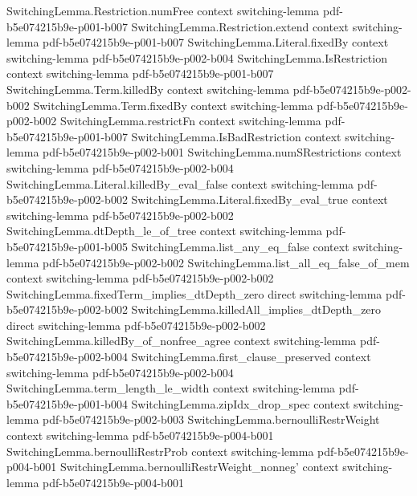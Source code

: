 \begin{theorem}
\proofstep
  {SwitchingLemma.Restriction.numFree}
  {context}
  {switching-lemma}
  {pdf-b5e074215b9e-p001-b007}
\proofstep
  {SwitchingLemma.Restriction.extend}
  {context}
  {switching-lemma}
  {pdf-b5e074215b9e-p001-b007}
\proofstep
  {SwitchingLemma.Literal.fixedBy}
  {context}
  {switching-lemma}
  {pdf-b5e074215b9e-p002-b004}
\proofstep
  {SwitchingLemma.IsRestriction}
  {context}
  {switching-lemma}
  {pdf-b5e074215b9e-p001-b007}
\proofstep
  {SwitchingLemma.Term.killedBy}
  {context}
  {switching-lemma}
  {pdf-b5e074215b9e-p002-b002}
\proofstep
  {SwitchingLemma.Term.fixedBy}
  {context}
  {switching-lemma}
  {pdf-b5e074215b9e-p002-b002}
\proofstep
  {SwitchingLemma.restrictFn}
  {context}
  {switching-lemma}
  {pdf-b5e074215b9e-p001-b007}
\proofstep
  {SwitchingLemma.IsBadRestriction}
  {context}
  {switching-lemma}
  {pdf-b5e074215b9e-p002-b001}
\proofstep
  {SwitchingLemma.numSRestrictions}
  {context}
  {switching-lemma}
  {pdf-b5e074215b9e-p002-b004}
\proofstep
  {SwitchingLemma.Literal.killedBy_eval_false}
  {context}
  {switching-lemma}
  {pdf-b5e074215b9e-p002-b002}
\proofstep
  {SwitchingLemma.Literal.fixedBy_eval_true}
  {context}
  {switching-lemma}
  {pdf-b5e074215b9e-p002-b002}
\proofstep
  {SwitchingLemma.dtDepth_le_of_tree}
  {context}
  {switching-lemma}
  {pdf-b5e074215b9e-p001-b005}
\proofstep
  {SwitchingLemma.list_any_eq_false}
  {context}
  {switching-lemma}
  {pdf-b5e074215b9e-p002-b002}
\proofstep
  {SwitchingLemma.list_all_eq_false_of_mem}
  {context}
  {switching-lemma}
  {pdf-b5e074215b9e-p002-b002}
\proofstep
  {SwitchingLemma.fixedTerm_implies_dtDepth_zero}
  {direct}
  {switching-lemma}
  {pdf-b5e074215b9e-p002-b002}
\proofstep
  {SwitchingLemma.killedAll_implies_dtDepth_zero}
  {direct}
  {switching-lemma}
  {pdf-b5e074215b9e-p002-b002}
\proofstep
  {SwitchingLemma.killedBy_of_nonfree_agree}
  {context}
  {switching-lemma}
  {pdf-b5e074215b9e-p002-b004}
\proofstep
  {SwitchingLemma.first_clause_preserved}
  {context}
  {switching-lemma}
  {pdf-b5e074215b9e-p002-b004}
\proofstep
  {SwitchingLemma.term_length_le_width}
  {context}
  {switching-lemma}
  {pdf-b5e074215b9e-p001-b004}
\proofstep
  {SwitchingLemma.zipIdx_drop_spec}
  {context}
  {switching-lemma}
  {pdf-b5e074215b9e-p002-b003}
\proofstep
  {SwitchingLemma.bernoulliRestrWeight}
  {context}
  {switching-lemma}
  {pdf-b5e074215b9e-p004-b001}
\proofstep
  {SwitchingLemma.bernoulliRestrProb}
  {context}
  {switching-lemma}
  {pdf-b5e074215b9e-p004-b001}
\proofstep
  {SwitchingLemma.bernoulliRestrWeight_nonneg'}
  {context}
  {switching-lemma}
  {pdf-b5e074215b9e-p004-b001}

\end{theorem}
